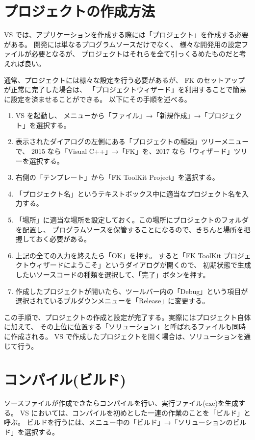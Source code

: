 \documentclass[a4j]{jarticle}
\begin{document}
\section{プロジェクトの作成方法}
VS では、アプリケーションを作成する際には「プロジェクト」を作成する必要がある。
開発には単なるプログラムソースだけでなく、
様々な開発用の設定ファイルが必要となるが、
プロジェクトはそれらを全て引っくるめたものだと考えれば良い。

通常、プロジェクトには様々な設定を行う必要があるが、
FK のセットアップが正常に完了した場合は、
「プロジェクトウィザード」を利用することで簡易に設定を済ませることができる。
以下にその手順を述べる。

\begin{enumerate}
 \item VS を起動し、
	メニューから「ファイル」→「新規作成」→「プロジェクト」を選択する。
 \item 表示されたダイアログの左側にある「プロジェクトの種類」ツリーメニューで、
	2015 なら「Visual C++」→「FK」を、2017 なら「ウィザード」ツリーを選択する。
 \item 右側の「テンプレート」から「FK ToolKit Project」を選択する。
 \item 「プロジェクト名」というテキストボックス中に適当なプロジェクト名を入力する。
 \item 「場所」に適当な場所を設定しておく。この場所にプロジェクトのフォルダを配置し、
	プログラムソースを保管することになるので、きちんと場所を把握しておく必要がある。
 \item 上記の全ての入力を終えたら「OK」を押す。
	すると「FK ToolKit プロジェクトウィザードにようこそ」というダイアログが開くので、
	初期状態で生成したいソースコードの種類を選択して、「完了」ボタンを押す。
 \item	作成したプロジェクトが開いたら、ツールバー内の「Debug」という項目が
 	選択されているプルダウンメニューを「Release」に変更する。
\end{enumerate}

この手順で、プロジェクトの作成と設定が完了する。実際にはプロジェクト自体に加えて、
その上位に位置する「ソリューション」と呼ばれるファイルも同時に作成される。
VS で作成したプロジェクトを開く場合は、ソリューションを通じて行う。


\section{コンパイル(ビルド)}
ソースファイルが作成できたらコンパイルを行い、実行ファイル(exe)を生成する。
VS においては、コンパイルを初めとした一連の作業のことを「ビルド」と呼ぶ。
ビルドを行うには、メニュー中の「ビルド」→「ソリューションのビルド」を選択する。
\end{document}

